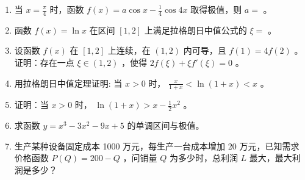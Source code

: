 \documentclass[12pt, a4paper]{article}
\begin{document}
\begin{enumerate}
    \item 当 $ x=\frac{\pi}{4} $ 时，函数 $ f(x)=a\cos x-\frac{1}{4}\cos 4x $ 取得极值，则 $a=$ \underline{\hspace{2cm}}。

    \item 函数 $ f(x)=\ln x $ 在区间 $[1,2]$ 上满足拉格朗日中值公式的 $ \xi= $ \underline{\hspace{2cm}}。

    \item 设函数 $ f(x) $ 在 $ [1,2] $ 上连续，在 $ (1,2) $ 内可导，且 $ f(1) = 4f(2) $ 。
    证明：存在一点 $ \xi \in (1,2) $ ，使得 $ 2f(\xi) + \xi f'(\xi) = 0 $ 。

    \item 用拉格朗日中值定理证明: 当 $x>0$ 时， $ \frac{x}{1+x}<\ln(1+x)<x $ 。

    \item 证明：当 $x>0$ 时， $ \ln(1+x)>x-\frac{1}{2}x^{2} $ 。

    \item 求函数 $ y = x^{3} - 3x^{2} - 9x + 5 $ 的单调区间与极值。

    \item 生产某种设备固定成本 1000 万元，每生产一台成本增加 20 万元，已知需求价格函数 $ P(Q) = 200 - Q $ ，问销量 $Q$ 为多少时，总利润 $L$ 最大，最大利润是多少？
\end{enumerate}
\end{document}
